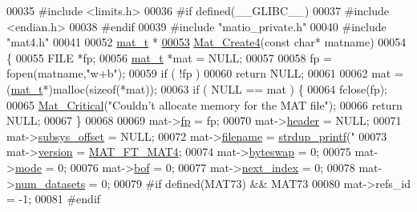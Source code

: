 \begin{DoxyCode}
00035 \textcolor{preprocessor}{#include <limits.h>}
00036 \textcolor{preprocessor}{#if defined(\_\_GLIBC\_\_)}
00037 \textcolor{preprocessor}{#include <endian.h>}
00038 \textcolor{preprocessor}{#endif}
00039 \textcolor{preprocessor}{#include "matio\_private.h"}
00040 \textcolor{preprocessor}{#include "mat4.h"}
00041 
00052 \hyperlink{struct__mat__t}{mat\_t} *
\hyperlink{mat4_8c_aa819b0bf76cab52a202742dd4102c18d}{00053} \hyperlink{mat4_8c_aa819b0bf76cab52a202742dd4102c18d}{Mat\_Create4}(\textcolor{keyword}{const} \textcolor{keywordtype}{char}* matname)
00054 \{
00055     FILE *fp;
00056     \hyperlink{struct__mat__t}{mat\_t} *mat = NULL;
00057 
00058     fp = fopen(matname,\textcolor{stringliteral}{"w+b"});
00059     \textcolor{keywordflow}{if} ( !fp )
00060         \textcolor{keywordflow}{return} NULL;
00061 
00062     mat = (\hyperlink{struct__mat__t}{mat\_t}*)malloc(\textcolor{keyword}{sizeof}(*mat));
00063     \textcolor{keywordflow}{if} ( NULL == mat ) \{
00064         fclose(fp);
00065         \hyperlink{group__mat__util_gaf51f2bfbb5580f575e4dd79757e2b80c}{Mat\_Critical}(\textcolor{stringliteral}{"Couldn't allocate memory for the MAT file"});
00066         \textcolor{keywordflow}{return} NULL;
00067     \}
00068 
00069     mat->\hyperlink{struct__mat__t_a85f562e407ca9ad4d2a6e14f839432b7}{fp}            = fp;
00070     mat->\hyperlink{struct__mat__t_a5ed5d0e4e3c4d76b626a8a1772d579c4}{header}        = NULL;
00071     mat->\hyperlink{struct__mat__t_a19317c01209959d755d69311960d3eec}{subsys\_offset} = NULL;
00072     mat->\hyperlink{struct__mat__t_a340b191598135edd03b6dec847f0b1b1}{filename}      = \hyperlink{group__mat__util_ga291b08f933c75fb70e3736b669896ebd}{strdup\_printf}(\textcolor{stringliteral}{"%
00073     mat->\hyperlink{struct__mat__t_a729c2bc0afc97485057a5af425635b1a}{version}       = \hyperlink{group___m_a_t_ggad03442b8378999189d510e3745c702b7a858b4f5da65548219b1c3ad47aa478d3}{MAT\_FT\_MAT4};
00074     mat->\hyperlink{struct__mat__t_a99d207977af5e04941ace56d71817a40}{byteswap}      = 0;
00075     mat->\hyperlink{struct__mat__t_aa43288b63b8edb7cadf0b79e2d1df2ee}{mode}          = 0;
00076     mat->\hyperlink{struct__mat__t_a0f87794a6113bd568fe591953e20ddf3}{bof}           = 0;
00077     mat->\hyperlink{struct__mat__t_a0163a12f9735356723bb604992639d9e}{next\_index}    = 0;
00078     mat->\hyperlink{struct__mat__t_af37d0ba323e65edb27ecd5a2f766a3a4}{num\_datasets}  = 0;
00079 \textcolor{preprocessor}{#if defined(MAT73) && MAT73}
00080     mat->refs\_id       = -1;
00081 \textcolor{preprocessor}{#endif}
}
\end{DoxyCode}

